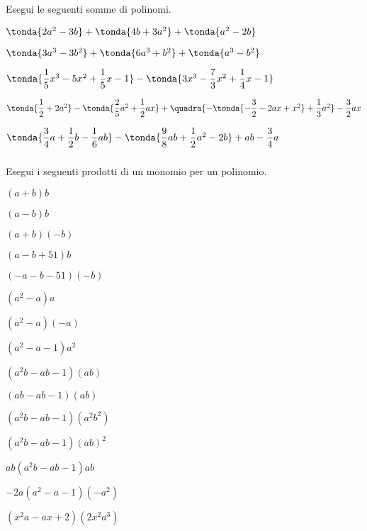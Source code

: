 \begin{esercizio}[*]
\label{ese:10.14}
Esegui le seguenti somme di polinomi.

\begin{enumeratea}
\spazielenx
\item 
\(\tonda{2a^{2}-3b}+\tonda{4b+3a^{2}}+\tonda{a^{2}-2b}\)
\item 
\(\tonda{3a^{3}-3b^{2}}+\tonda{6a^{3}+b^{2}}+\tonda{a^{3}-b^{2}}\)
\item 
\(\tonda{\dfrac{1}{5}x^{3}-5x^{2}+\dfrac{1}{5}x-1}-
\tonda{3x^{3}-\dfrac{7} {3}x^{2}+\dfrac{1}{4}x-1}\)
\item 
\(\tonda{\dfrac{1}{2}+2a^{2}}-\tonda{\dfrac{2}{5}a^{2}+\dfrac{1}{2}{ax}}+
\quadra{-\tonda{-{\dfrac{3}{2}}-2{ax}+x^{2}}+\dfrac{1}{3}a^{2}}
-\dfrac{3}{2}{ax}\)
\item 
\(\tonda{\dfrac{3}{4}a+\dfrac{1}{2}b-\dfrac{1}{6}{ab}}-
\tonda{\dfrac{9}{8}{ab}+\dfrac{1}{2}a^{2}-2b}+{ab}-\dfrac{3}{4}a\)
\end{enumeratea}
\end{esercizio}

\pagebreak %

\subsubsection*{}

\begin{esercizio}
\label{ese:10.15}
Esegui i seguenti prodotti di un monomio per un polinomio.
\begin{htmulticols}{3}
\begin{enumeratea}
\spazielenx
\item \((a + b)b\)
\item \((a - b)b\)
\item \((a +b)(-b)\)
\item \((a - b + 51)b\)
\item \((-a - b -51)(-b)\)
\item \((a^{2} - a)a\)
\item \((a^{2} - a)(-a)\)
\item \((a^{2}- a - 1)a^{2}\)
\item \((a^{2}b-ab - 1)(ab)\)
\item \((ab- ab - 1)(ab)\)
\item \((a^{2}b- ab -1)(a^{2}b^{2})\)
\item \((a^{2}b-ab - 1)(ab)^{2}\)
\item \(ab(a^{2}b- ab -1)ab\)
\item \(-2a(a^{2} - a - 1)(-a^{2})\)
\item \((x^{2}a- ax+2)(2x^{2}a^{3})\)
\end{enumeratea}
\end{htmulticols}
\end{esercizio}

